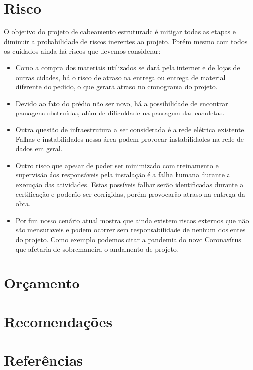 \documentclass[	DIV=calc,%
							paper=a4,%
							fontsize=12pt,%
							onecolumn]{scrartcl}	 					%
\begin{document}
\section{Risco}
O objetivo do projeto de cabeamento estruturado é mitigar todas as etapas e diminuir a probabilidade de riscos inerentes ao projeto. Porém mesmo com todos os cuidados ainda há riscos que devemos considerar:
\begin{itemize}
\item Como a compra dos materiais utilizados se dará pela internet e de lojas de outras cidades, há o risco de atraso na entrega ou entrega de material diferente do pedido, o que gerará atraso no cronograma do projeto.

\item Devido ao fato do prédio não ser novo, há a possibilidade de encontrar passagens obstruídas, além de dificuldade na passagem das canaletas.

\item Outra questão de infraestrutura a ser considerada é a rede elétrica existente. Falhas e instabilidades nessa área podem provocar instabilidades na rede de dados em geral.

\item Outro risco que apesar de poder ser minimizado com treinamento e supervisão dos responsáveis pela instalação é a falha humana durante a execução das atividades. Estas possíveis falhar serão identificadas durante a certificação e poderão ser corrigidas, porém provocarão atraso na entrega da obra. 

\item Por fim nosso cenário atual mostra que ainda existem riscos externos que não são mensuráveis e podem ocorrer sem responsabilidade de nenhum dos entes do projeto. Como exemplo podemos citar a pandemia do novo Coronavírus que afetaria de sobremaneira o andamento do projeto.
\end{itemize}

\section{Orçamento}

\section{Recomendações}
\clearpage
\section{Referências} %
\end{document}
